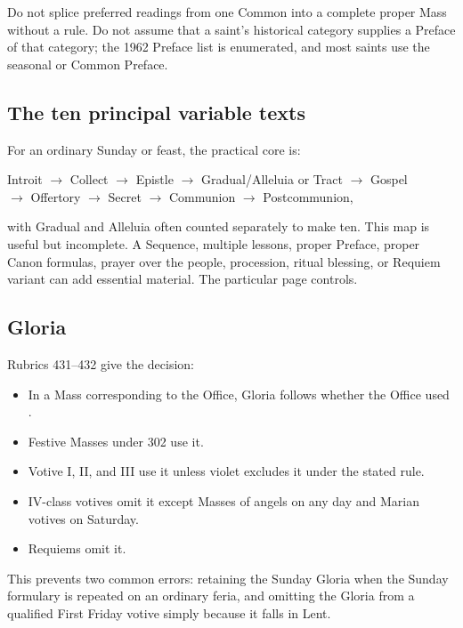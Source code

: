 Do not splice preferred readings from one Common into a complete proper Mass without a rule. Do not assume that a saint's historical category supplies a Preface of that category; the 1962 Preface list is enumerated, and most saints use the seasonal or Common Preface.

\subsection{The ten principal variable texts}

For an ordinary Sunday or feast, the practical core is:

\begin{center}
\small
Introit $\rightarrow$ Collect $\rightarrow$ Epistle $\rightarrow$ Gradual/Alleluia or Tract $\rightarrow$ Gospel\\
$\rightarrow$ Offertory $\rightarrow$ Secret $\rightarrow$ Communion $\rightarrow$ Postcommunion,
\end{center}

with Gradual and Alleluia often counted separately to make ten. This map is useful but incomplete. A Sequence, multiple lessons, proper Preface, proper Canon formulas, prayer over the people, procession, ritual blessing, or Requiem variant can add essential material. The particular page controls.

\subsection{Gloria}

Rubrics 431--432 give the decision:

\begin{itemize}
\item In a Mass corresponding to the Office, Gloria follows whether the Office used .
\item Festive Masses under 302 use it.
\item Votive I, II, and III use it unless violet excludes it under the stated rule.
\item IV-class votives omit it except Masses of angels on any day and Marian votives on Saturday.
\item Requiems omit it.
\end{itemize}

This prevents two common errors: retaining the Sunday Gloria when the Sunday formulary is repeated on an ordinary feria, and omitting the Gloria from a qualified First Friday votive simply because it falls in Lent.

